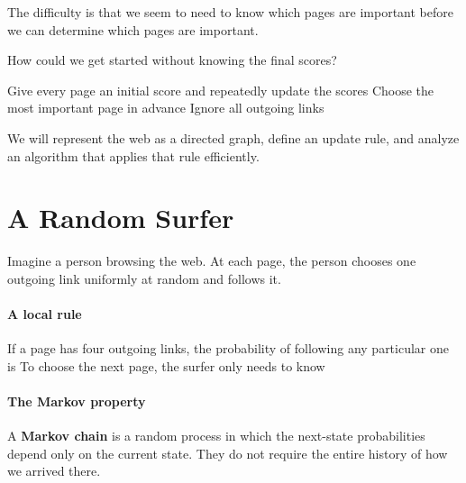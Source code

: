 \documentclass[11pt]{article}
\begin{document}
The difficulty is that we seem to need to know which pages are important
before we can determine which pages are important.

\begin{Qu}
    How could we get started without knowing the final scores?
    \begin{itemize}
        \aitem Give every page an initial score and repeatedly update the scores
        \bitem Choose the most important page in advance
        \citem Ignore all outgoing links
    \end{itemize}
\end{Qu}

\vfill
We will represent the web as a directed graph, define an update rule, and
analyze an algorithm that applies that rule efficiently.

\newpage
\section{A Random Surfer}
Imagine a person browsing the web. At each page, the person chooses one
outgoing link uniformly at random and follows it.

\paragraph{A local rule}
If a page has four outgoing links, the probability of following any particular
one is  To choose the next page, the surfer only needs to know

\begin{center}
\end{center}

\paragraph{The Markov property}
A \textbf{Markov chain} is a random process in which the next-state
probabilities depend only on the current state. They do not require the
entire history of how we arrived there.
\end{document}

